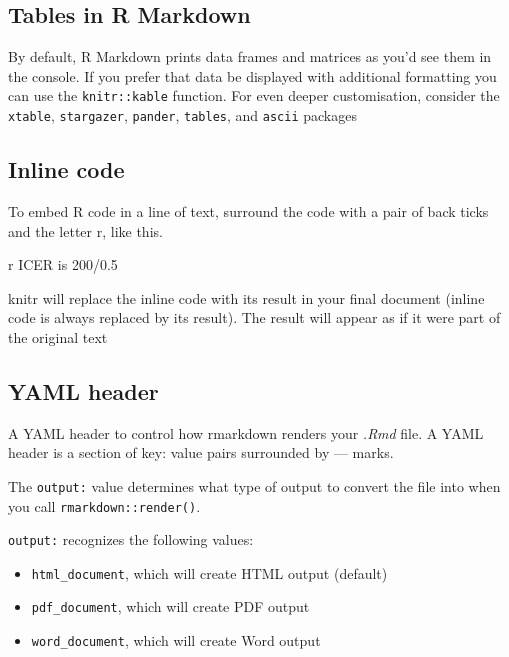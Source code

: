 \documentclass[
]{article}
\newenvironment{Shaded}{\begin{snugshade}}{\end{snugshade}}
\newcommand{\AttributeTok}[1]{\textcolor[rgb]{0.77,0.63,0.00}{#1}}
\newcommand{\StringTok}[1]{\textcolor[rgb]{0.31,0.60,0.02}{#1}}
\providecommand{\tightlist}{%
  \setlength{\itemsep}{0pt}\setlength{\parskip}{0pt}}
\begin{document}
\hypertarget{tables-in-r-markdown}{%
\subsection{Tables in R Markdown}\label{tables-in-r-markdown}}

By default, R Markdown prints data frames and matrices as you'd see them
in the console. If you prefer that data be displayed with additional
formatting you can use the \texttt{knitr::kable} function. For even
deeper customisation, consider the \texttt{xtable}, \texttt{stargazer},
\texttt{pander}, \texttt{tables}, and \texttt{ascii} packages

\hypertarget{inline-code}{%
\subsection{Inline code}\label{inline-code}}

To embed R code in a line of text, surround the code with a pair of back
ticks and the letter r, like this.

\begin{Shaded}
\begin{Highlighting}[]
\StringTok{\textasciigrave{}}\AttributeTok{r  ICER is 200/0.5}\StringTok{\textasciigrave{}}
\end{Highlighting}
\end{Shaded}

knitr will replace the inline code with its result in your final
document (inline code is always replaced by its result). The result will
appear as if it were part of the original text

\hypertarget{yaml-header}{%
\subsection{YAML header}\label{yaml-header}}

A YAML header to control how rmarkdown renders your \emph{.Rmd} file. A
YAML header is a section of key: value pairs surrounded by --- marks.

The \texttt{output:} value determines what type of output to convert the
file into when you call \texttt{rmarkdown::render()}.

\texttt{output:} recognizes the following values:

\begin{itemize}
\tightlist
\item
  \texttt{html\_document}, which will create HTML output (default)
\item
  \texttt{pdf\_document}, which will create PDF output
\item
  \texttt{word\_document}, which will create Word output
\end{itemize}
\end{document}
